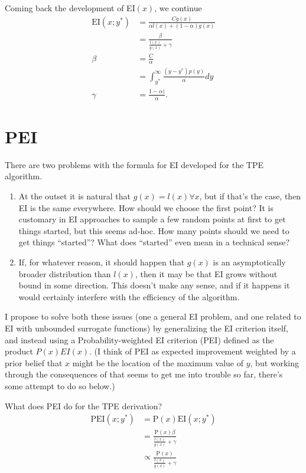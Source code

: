 \documentclass{article}
\begin{document}
    Coming back the development of EI$(x)$, we continue
    \begin{align}
    \mathrm{EI}(x; y^{*})
        &= \frac{Cg(x)}{\alpha l(x) + (1 - \alpha) g(x)} \\
        &= \frac{\beta}{\frac{l(x)}{g(x)} + \gamma} \\
    \beta 
        &= \frac{C}{\alpha} \\
        &= \int_{y^{*}}^{\infty} \frac{(y - y^{*})p(y)}{\alpha} dy \\
    \gamma
        &= \frac{1 - \alpha)}{\alpha}.
    \end{align}



\section{PEI}

    There are two problems with the formula for EI developed for the TPE algorithm.
    \begin{enumerate}
        \item At the outset it is natural that $g(x) = l(x) \forall x$, but if that's the case, then EI is the same everywhere.
            How should we choose the first point? It is customary in EI approaches to sample a few random points at first to get things started,
            but this seems ad-hoc. How many points should we need to get things ``started''?  What does ``started'' even  mean in a technical sense?
        \item If, for whatever reason, it should happen that $g(x)$ is an asymptotically broader distribution than $l(x)$,
            then it may be that EI grows without bound in some direction. This doesn't make any sense, and if it happens it would certainly
            interfere with the efficiency of the algorithm.
    \end{enumerate}

    I propose to solve both these issues (one a general EI problem, and one related to EI with unbounded surrogate functions) by generalizing
    the EI criterion itself, and instead using a Probability-weighted EI criterion (PEI)
    defined as the product $P(x) EI(x)$.
    (I think of PEI as expected improvement weighted by a prior belief that $x$ might be the location of the maximum value of $y$, but
    working through the consequences of that seems to get me into trouble so far, there's some attempt to do so below.)

    What does PEI do for the TPE derivation?
    \begin{align}
    \mathrm{PEI}(x; y^{*})
        &= \mathrm{P}(x) \mathrm{EI}(x; y^*) \\
        &= \frac{\mathrm{P}(x)\beta}{\frac{l(x)}{g(x)} + \gamma} \\
        &\propto \frac{\mathrm{P}(x)}{\frac{l(x)}{g(x)} + \gamma}
    \end{align}
\end{document}
